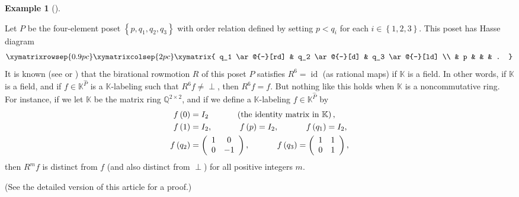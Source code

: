 \documentclass[numbers=enddot,12pt,final,onecolumn,notitlepage]{scrartcl}%
\theoremstyle{definition}
\newtheorem{exam}[theo]{Example}
\newenvironment{example}[1][]
{\begin{exam}[#1]\begin{leftbar}}
{\end{leftbar}\end{exam}}
\newenvironment{vershort}{}{}
\newcommand{\undf}{\operatorname*{\bot}}
\begin{document}
\begin{example}
\label{exa.illbehaved.claw} Let $P$ be the four-element poset $\left\{
p,q_{1},q_{2},q_{3}\right\}  $ with order relation defined by setting
$p<q_{i}$ for each $i\in\left\{  1,2,3\right\}  $. This poset has Hasse
diagram
\[
\xymatrixrowsep{0.9pc}\xymatrixcolsep{2pc}\xymatrix{
q_1 \ar@{-}[rd] & q_2 \ar@{-}[d] & q_3 \ar@{-}[ld] \\
& p & & & .
}
\]
It is known (see \cite[Example 18]{bir-row-1} or \cite[Corollary
76]{bir-row-1}) that the birational rowmotion $R$ of this poset $P$ satisfies
$R^{6}=\operatorname*{id}$ (as rational maps) if $\mathbb{K}$ is a field. In
other words, if $\mathbb{K}$ is a field, and if $f\in\mathbb{K}^{\widehat{P}}$
is a $\mathbb{K}$-labeling such that $R^{6}f\neq\undf$, then $R^{6}f=f$. But
nothing like this holds when $\mathbb{K}$ is a noncommutative ring. For
instance, if we let $\mathbb{K}$ be the matrix ring $\mathbb{Q}^{2\times2}$,
and if we define a $\mathbb{K}$-labeling $f\in\mathbb{K}^{\widehat{P}}$ by%
\begin{align*}
f\left(  0\right)   &  =I_{2}\ \ \ \ \ \ \ \ \ \ \left(  \text{the identity
matrix in }\mathbb{K}\right)  ,\\
f\left(  1\right)   &  =I_{2},\ \ \ \ \ \ \ \ \ \ f\left(  p\right)
=I_{2},\ \ \ \ \ \ \ \ \ \ f\left(  q_{1}\right)  =I_{2},\\
f\left(  q_{2}\right)   &  =\left(
\begin{array}
[c]{cc}%
1 & 0\\
0 & -1
\end{array}
\right)  ,\ \ \ \ \ \ \ \ \ \ f\left(  q_{3}\right)  =\left(
\begin{array}
[c]{cc}%
1 & 1\\
0 & 1
\end{array}
\right)  ,
\end{align*}
then $R^{m}f$ is distinct from $f$ (and also distinct from $\undf$) for all
positive integers $m$.
\end{example}

\begin{vershort}
(See the detailed version of this article for a proof.)
\end{vershort}
\end{document}
